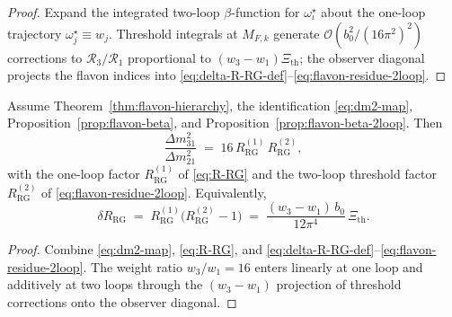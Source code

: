 \begin{proof}
Expand the integrated two-loop $\beta$-function for $\omega^\star_\iota$ about
the one-loop trajectory $\omega^\star_j\equiv w_j$. Threshold integrals at
$M_{F,k}$ generate $\mathcal{O}(b_0^2/(16\pi^2)^2)$ corrections to
$\mathcal{R}_3/\mathcal{R}_1$ proportional to $(w_3-w_1)\Xi_{\mathrm{th}}$;
the observer diagonal projects the flavon indices into
\eqref{eq:delta-R-RG-def}--\eqref{eq:flavon-residue-2loop}.
\end{proof}

\begin{theorem}
\label{thm:nu-ratio-2loop}
Assume Theorem~\ref{thm:flavon-hierarchy}, the identification \eqref{eq:dm2-map},
Proposition~\ref{prop:flavon-beta}, and Proposition~\ref{prop:flavon-beta-2loop}.
Then
\begin{equation}\label{eq:nu-ratio-factorized}
  \frac{\Delta m^2_{31}}{\Delta m^2_{21}}
  \;=\;
  16\,R_{\mathrm{RG}}^{(1)}\,R_{\mathrm{RG}}^{(2)},
\end{equation}
with the one-loop factor $R_{\mathrm{RG}}^{(1)}$ of \eqref{eq:R-RG} and
the two-loop threshold factor $R_{\mathrm{RG}}^{(2)}$ of
\eqref{eq:flavon-residue-2loop}. Equivalently,
\begin{equation}\label{eq:R-RG-total}
  \delta R_{\mathrm{RG}}
  \;=\;
  R_{\mathrm{RG}}^{(1)}\bigl(R_{\mathrm{RG}}^{(2)}-1\bigr)
  \;=\;
  \frac{(w_3-w_1)\,b_0}{12\pi^4}\,\Xi_{\mathrm{th}}.
\end{equation}
\end{theorem}

\begin{proof}
Combine \eqref{eq:dm2-map}, \eqref{eq:R-RG}, and
\eqref{eq:delta-R-RG-def}--\eqref{eq:flavon-residue-2loop}. The weight ratio
$w_3/w_1=16$ enters linearly at one loop and additively at two loops through
the $(w_3-w_1)$ projection of threshold corrections onto the observer diagonal.
\end{proof}

